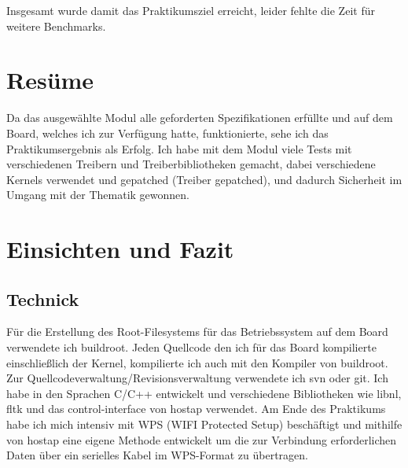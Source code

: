 \documentclass[pdftex,12pt,a4paper]{scrreprt}
\begin{document}
Insgesamt wurde damit das Praktikumsziel erreicht, leider fehlte die Zeit für weitere Benchmarks.\\

\section{Resüme}
Da das ausgewählte Modul alle geforderten Spezifikationen erfüllte und auf dem Board, welches ich zur Verfügung hatte, funktionierte, sehe ich das Praktikumsergebnis als Erfolg. Ich habe mit dem Modul viele Tests mit verschiedenen Treibern und Treiberbibliotheken gemacht, dabei verschiedene Kernels verwendet und gepatched (Treiber gepatched), und dadurch Sicherheit im Umgang mit der Thematik gewonnen.
\section{Einsichten und Fazit}

\subsection{Technick}
Für die Erstellung des Root-Filesystems für das Betriebssystem auf dem Board verwendete ich buildroot. Jeden Quellcode den ich für das Board kompilierte einschließlich der Kernel, kompilierte ich auch mit den Kompiler von buildroot. Zur Quellcodeverwaltung/Revisionsverwaltung verwendete ich svn oder git. Ich habe in den Sprachen C/C++ entwickelt und verschiedene Bibliotheken wie libnl, fltk und das control-interface von hostap verwendet. Am Ende des Praktikums habe ich mich intensiv mit WPS (WIFI Protected Setup) beschäftigt und mithilfe von hostap eine eigene Methode entwickelt um die zur Verbindung erforderlichen Daten über ein serielles Kabel im WPS-Format zu übertragen.
\end{document}
